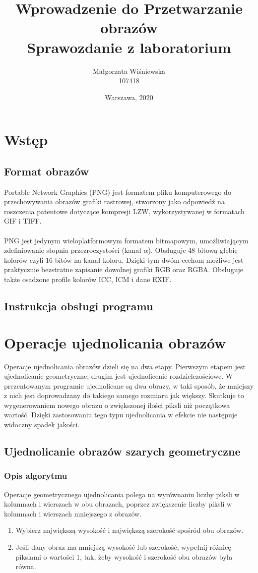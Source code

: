 \documentclass[a4paper,12pt, titlepage]{report}
\title{Wprowadzenie do Przetwarzanie obrazów\\Sprawozdanie z laboratorium}
\author{Małgorzata Wiśniewska\\107418}
\date{Warszawa, 2020}
\begin{document}
\maketitle
\tableofcontents
\chapter{Wstęp}

\section{Format obrazów}
\par Portable Network Graphics (PNG) jest formatem pliku komputerowego do przechowywania obrazów grafiki rastrowej, stworzony jako odpowiedź na roszczenia patentowe dotyczące kompresji LZW, wykorzystywanej w formatach GIF i TIFF. \\\\PNG jest jedynym wieloplatformowym formatem bitmapowym, umożliwiającym zdefiniowanie stopnia przezroczystości (kanał \(\alpha\)). Obsługuje 48-bitową głębię kolorów czyli 16 bitów na kanał koloru. Dzięki tym dwóm cechom możliwe jest praktycznie bezstratne zapisanie dowolnej grafiki RGB oraz RGBA. Obsługuje także osadzone profile kolorów ICC, ICM i dane EXIF.
\section{Instrukcja obsługi programu}


\chapter{Operacje ujednolicania obrazów}
Operacje ujednolicania obrazów dzieli się na dwa etapy. Pierwszym etapem jest ujednolicanie geometryczne, drugim jest ujednolicenie rozdzielczościowe. W prezentowanym programie ujednolicane są dwa obrazy, w taki sposób, że mniejszy z nich jest doprowadzany do takiego samego rozmiaru jak większy. Skutkuje to wygenerowaniem nowego obrazu o zwiększonej ilości piksli niż początkowa wartość. Dzięki zastosowaniu tego typu ujednolicania w efekcie nie następuje widoczny spadek jakości. 

\section{Ujednolicanie obrazów szarych geometryczne}
\subsection*{Opis algorytmu}
\par Operacje geometrycznego ujednolicania polega na wyrównaniu liczby piksli w kolumnach i wierszach w obu obrazach, poprzez zwiększenie liczby piksli w kolumnach i wierszach mniejszego z obrazów.
\begin{enumerate}
\item Wybierz największą wysokość i największą szerokość spośród obu obrazów.
\item Jeśli dany obraz ma mniejszą wysokość lub szerokość, wypełnij różnicę pikslami o wartości 1, tak, żeby wysokość i szerokość obu obrazów była równa.
\end{enumerate}
\end{document}
